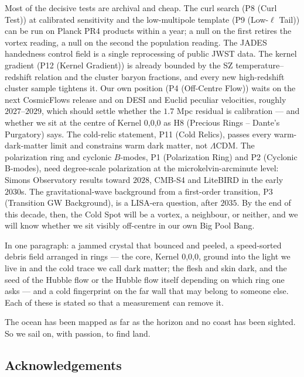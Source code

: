 \documentclass[
  11pt,
]{article}
\begin{document}
Most of the decisive tests are archival and cheap. The curl search (P8
(Curl Test)) at calibrated sensitivity and the low-multipole template
(P9 (Low-\(\ell\) Tail)) can be run on Planck PR4 products within a
year; a null on the first retires the vortex reading, a null on the
second the population reading. The JADES handedness control field is a
single reprocessing of public JWST data. The kernel gradient (P12
(Kernel Gradient)) is already bounded by the SZ temperature--redshift
relation and the cluster baryon fractions, and every new high-redshift
cluster sample tightens it. Our own position (P4 (Off-Centre Flow))
waits on the next CosmicFlows release and on DESI and Euclid peculiar
velocities, roughly \(2027\)--\(2029\), which should settle whether the
\(1.7\) Mpc residual is calibration --- and whether we sit at the centre
of Kernel 0,0,0 as H8 (Precious Rings -- Dante's Purgatory) says. The
cold-relic statement, P11 (Cold Relics), passes every warm-dark-matter
limit and constrains warm dark matter, not \(\Lambda\)CDM. The
polarization ring and cyclonic \(B\)-modes, P1 (Polarization Ring) and
P2 (Cyclonic B-modes), need degree-scale polarization at the
microkelvin-arcminute level: Simons Observatory results toward \(2028\),
CMB-S4 and LiteBIRD in the early \(2030\)s. The gravitational-wave
background from a first-order transition, P3 (Transition GW Background),
is a LISA-era question, after \(2035\). By the end of this decade, then,
the Cold Spot will be a vortex, a neighbour, or neither, and we will
know whether we sit visibly off-centre in our own Big Pool Bang.

In one paragraph: a jammed crystal that bounced and peeled, a
speed-sorted debris field arranged in rings --- the core, Kernel 0,0,0,
ground into the light we live in and the cold trace we call dark matter;
the flesh and skin dark, and the seed of the Hubble flow or the Hubble
flow itself depending on which ring one asks --- and a cold fingerprint
on the far wall that may belong to someone else. Each of these is stated
so that a measurement can remove it.

The ocean has been mapped as far as the horizon and no coast has been
sighted. So we sail on, with passion, to find land.

\hypertarget{acknowledgements}{%
\subsection{\texorpdfstring{\textbf{Acknowledgements}}{Acknowledgements}}\label{acknowledgements}}
\end{document}
